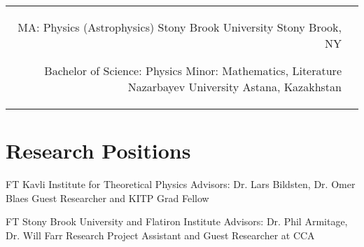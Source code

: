 \documentclass[10pt]{article} %
\begin{document}
\begin{paracol}{1}
\begin{supertabular}{rl}
	
	{MA:} %
	{Physics (Astrophysics)} %
	{} %
	{Stony Brook University} %
	{Stony Brook, NY}
	
	
	{Bachelor of Science:} %
	{Physics} %
	{Minor: Mathematics, Literature} %
	{Nazarbayev University} %
	{Astana, Kazakhstan}
	

\end{supertabular}

\section{Research Positions}




{FT} %
{Kavli Institute for Theoretical Physics} %
{Advisors: Dr. Lars Bildsten, Dr. Omer Blaes} %
{Guest Researcher and KITP Grad Fellow} %

{FT} %
{Stony Brook University and Flatiron Institute} %
{Advisors: Dr. Phil Armitage, Dr. Will Farr} %
{Research Project Assistant and Guest Researcher at CCA} %



\end{paracol}
\end{document}
